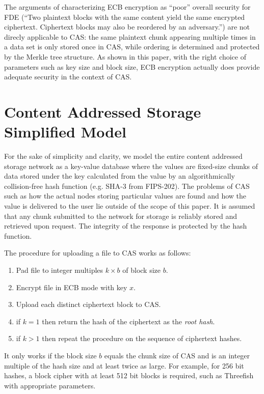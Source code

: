 \documentclass{llncs}
\begin{document}
The arguments of \cite{fde} characterizing ECB encryption as ``poor'' 
overall security for FDE (``Two plaintext blocks with the same content 
yield the same encrypted ciphertext. Ciphertext blocks may also be 
reordered by an adversary.'') are not direcly applicable to CAS: the 
same plaintext chunk appearing multiple times in a data set is only 
stored once in CAS, while ordering is determined and protected by the 
Merkle tree structure\cite{mt}. As shown in this paper, with the right 
choice of parameters such as key size and block size, ECB encryption 
actually does provide adequate security in the context of CAS.

\section{Content Addressed Storage Simplified Model}\label{sec:Model}

For the sake of simplicity and clarity, we model the entire content 
addressed storage network as a key-value database where the values are 
fixed-size chunks of data stored under the key calculated from the value 
by an algorithmically collision-free hash function (e.g. SHA-3 from 
FIPS-202\cite{sha3}). The problems of CAS such as how the actual nodes 
storing particular values are found and how the value is delivered to 
the user lie outside of the scope of this paper. It is assumed that any 
chunk submitted to the network for storage is reliably stored and retrieved 
upon request. The integrity of the response is protected by the hash function.

The procedure for uploading a file to CAS works as follows:
\begin{enumerate}
\item Pad file to integer multiples $k \times b$ of block size $b$.
\item Encrypt file in ECB mode with key $x$. \label{item:ecb}
\item Upload each distinct ciphertext block to CAS.
\item if $k = 1$ then return the hash of the ciphertext as the {\em root hash}.
\item if $k > 1$ then repeat the procedure on the sequence of ciphertext hashes.
\end{enumerate}

It only works if the block size $b$ equals the chunk size of CAS and is 
an integer multiple of the hash size and at least twice as large. For 
example, for 256 bit hashes, a block cipher with at least 512 bit blocks
is required, such as Threefish\cite{threefish} with appropriate parameters.
\end{document}
